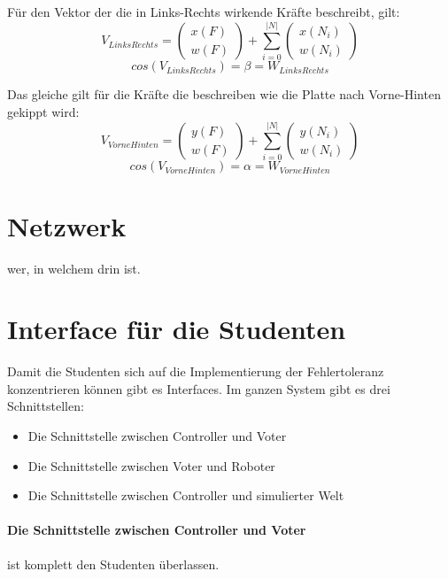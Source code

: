 \documentclass[
    12pt,
    bibliography=totoc,
    ngerman
]{scrartcl}
\begin{document}
F{\"{u}}r den Vektor der die in Links-Rechts wirkende Kr{\"{a}}fte beschreibt, gilt:
$$ V_{LinksRechts} = \begin{pmatrix}x(F) \\ w(F) \end{pmatrix} + \sum_{i=0}^{|N|} \begin{pmatrix} x(N_i) \\ w(N_i) \end{pmatrix} $$
$$ cos(V_{LinksRechts}) = \beta = W_{LinksRechts} $$

Das gleiche gilt f{\"{u}}r die Kr{\"{a}}fte die beschreiben wie die Platte nach Vorne-Hinten gekippt wird:
$$ V_{VorneHinten} = \begin{pmatrix}y(F) \\ w(F) \end{pmatrix} + \sum_{i=0}^{|N|} \begin{pmatrix} y(N_i) \\ w(N_i) \end{pmatrix} $$
$$ cos(V_{VorneHinten}) = \alpha = W_{VorneHinten} $$

\clearpage
\section{Netzwerk}\label{network}
wer, in welchem drin ist. 

\clearpage
\section{Interface f{\"{u}}r die Studenten}\label{interface}
Damit die Studenten sich auf die Implementierung der Fehlertoleranz konzentrieren k{\"{o}}nnen gibt es Interfaces.  
Im ganzen System gibt es drei Schnittstellen:
\begin{itemize}
\item Die Schnittstelle zwischen Controller und Voter
\item Die Schnittstelle zwischen Voter und Roboter
\item Die Schnittstelle zwischen Controller und simulierter Welt 
\end{itemize}

\paragraph{Die Schnittstelle zwischen Controller und Voter} ist komplett den Studenten {\"{u}}berlassen.
\end{document}
